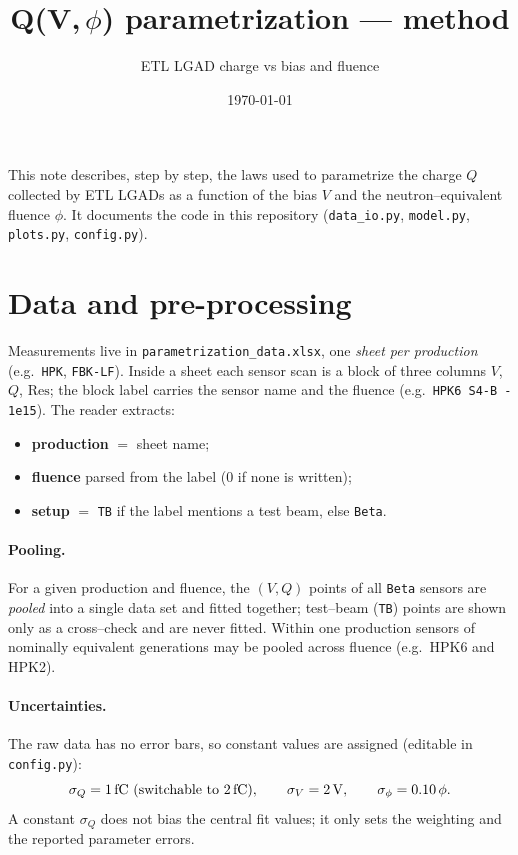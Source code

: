 \documentclass[11pt]{article}
\title{\textbf{Q(V,\,$\phi$) parametrization --- method}}
\author{ETL LGAD charge vs bias and fluence}
\date{\today}
\newcommand{\fC}{\ensuremath{\mathrm{fC}}}
\newcommand{\code}[1]{\texttt{#1}}
\begin{document}
\maketitle

\noindent
This note describes, step by step, the laws used to parametrize the charge
$Q$ collected by ETL LGADs as a function of the bias $V$ and the
neutron--equivalent fluence $\phi$. It documents the code in this repository
(\code{data\_io.py}, \code{model.py}, \code{plots.py}, \code{config.py}).

\section{Data and pre-processing}
Measurements live in \code{parametrization\_data.xlsx}, one \emph{sheet per
production} (e.g.\ \code{HPK}, \code{FBK-LF}). Inside a sheet each sensor scan
is a block of three columns $V$, $Q$, $\mathrm{Res}$; the block label carries the
sensor name and the fluence (e.g.\ \code{HPK6 S4-B - 1e15}). The reader extracts:
\begin{itemize}[nosep]
  \item \textbf{production} $=$ sheet name;
  \item \textbf{fluence} parsed from the label ($0$ if none is written);
  \item \textbf{setup} $=$ \code{TB} if the label mentions a test beam, else \code{Beta}.
\end{itemize}

\paragraph{Pooling.} For a given production and fluence, the $(V,Q)$ points of all
\code{Beta} sensors are \emph{pooled} into a single data set and fitted together;
test--beam (\code{TB}) points are shown only as a cross--check and are never
fitted. Within one production sensors of nominally equivalent generations may be
pooled across fluence (e.g.\ HPK6 and HPK2).

\paragraph{Uncertainties.} The raw data has no error bars, so constant values are
assigned (editable in \code{config.py}):
\begin{equation}
  \sigma_Q = \SI{1}{\fC}\ \text{(switchable to \SI{2}{\fC})},\qquad
  \sigma_V = \SI{2}{\volt},\qquad
  \sigma_\phi = 0.10\,\phi .
\end{equation}
A constant $\sigma_Q$ does not bias the central fit values; it only sets the
weighting and the reported parameter errors.
\end{document}

